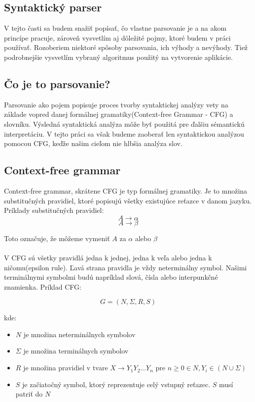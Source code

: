 \documentclass[12pt,a4paper]{report}
\theoremstyle{definition}
\theoremstyle{remark}
\begin{document}
\subsection{Syntaktický parser}
V tejto časti sa budem snažiť popísať, čo vlastne parsovanie je a na akom princípe pracuje, zároveň vysvetlím aj dôležité pojmy, ktoré budem v práci používať. Rozoberiem niektoré spôsoby parsovania, ich výhody a nevýhody. Tiež podrobnejšie vysvetlím vybraný algoritmus použitý na vytvorenie aplikácie.

\subsection{Čo je to parsovanie?}
Parsovanie ako pojem popisuje proces tvorby syntaktickej analýzy vety na základe vopred danej formálnej gramatiky(Context-free Grammar - CFG) a slovníku. Výsledná  syntaktická analýza môže byť použitá pre ďalšiu sémantickú interpretáciu. V tejto práci sa však budeme zaoberať len syntaktickou analýzou pomocou CFG, keďže našim cieľom nie hlbšia analýza slov. \cite{Pulman}\cite{Girju}

\subsection{Context-free grammar}
Context-free grammar\cite{foja}, skrátene CFG je typ formálnej gramatiky. Je to množina substitučných pravidiel, ktoré popisujú všetky existujúce reťazce v danom jazyku. Príklady substitučných pravidiel:
$$ A \to \alpha $$
$$ A \to \beta $$

Toto označuje, že môžeme vymeniť $A$ za $\alpha$ alebo $\beta$ \\ \\
V CFG sú všetky pravidlá jedna k jednej, jedna k veľa alebo jedna k ničomu(epsilon rule). Ľavá strana pravidla je vždy neterminálny symbol. Našimi terminálnymi symbolmi budú napríklad slová, čísla alebo interpunkčné znamienka. Príklad CFG:

$$ G = (N, \Sigma , R, S) $$

kde:
\begin{itemize}
\item $N$ je množina neterminálnych symbolov
\item $\Sigma$ je množina terminálnych symbolov
\item $R$ je množina pravidiel v tvare $X \to Y_1 Y_2 \dots Y_n$ pre $ n \geq 0 \in N, Y_i \in ( N \cup \Sigma )$
\item $S$ je začiatočný symbol, ktorý reprezentuje celý vstupný reťazec. $S$ musí patriť do $N$
\end{itemize}
\end{document}
